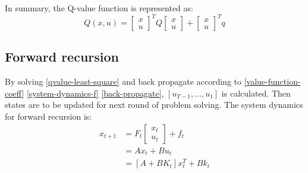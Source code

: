 \documentclass{article}
\begin{document}
In summary, the Q-value function is represented as:
\begin{equation}
    Q(x, u) = \begin{bmatrix}
        x\\u
    \end{bmatrix}^T Q  \begin{bmatrix}
        x\\u
    \end{bmatrix} +  \begin{bmatrix}
        x\\u
    \end{bmatrix}^T q
\end{equation}

\subsection{Forward recursion}
By solving \eqref{qvalue-least-square} and back propagate according to \eqref{value-function-coeff} \eqref{system-dynamics-f} \eqref{back-propagate}, $[u_{T - 1}, ..., u_1]$ is calculated. Then states are to be updated for next round of problem solving. The system dynamics for forward recursion is:
\begin{align}
    x_{t + 1} &= F_t\begin{bmatrix}
        x_t\\u_t
    \end{bmatrix} + f_t\\
    &= Ax_t + Bu_t\\
    &= [A+BK_t ]x_t^T + Bk_t
\end{align}
\end{document}
